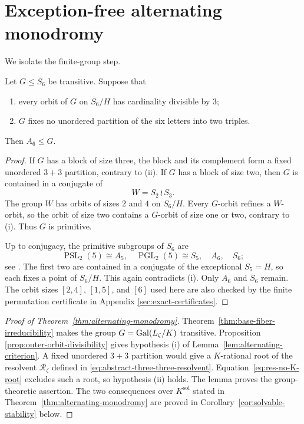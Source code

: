 \section{Exception-free alternating monodromy}
\label{sec:alternating-monodromy}

We isolate the finite-group step.

\begin{lemma}
\label{lem:alternating-criterion}
Let $G\le S_6$ be transitive.  Suppose that
\begin{enumerate}[label=\textup{(\roman*)}]
 \item every orbit of $G$ on $S_6/H$ has cardinality divisible by $3$;
 \item $G$ fixes no unordered partition of the six letters into two
       triples.
\end{enumerate}
Then $A_6\le G$.
\end{lemma}

\begin{proof}
If $G$ has a block of size three, the block and its complement form a
fixed unordered $3+3$ partition, contrary to \textup{(ii)}.  If $G$
has a block of size two, then $G$ is contained in a conjugate of
\[
 W=S_2\mathbin{\wr}S_3.
\]
The group $W$ has orbits of sizes $2$ and $4$ on $S_6/H$.  Every
$G$-orbit refines a $W$-orbit, so the orbit of size two contains a
$G$-orbit of size one or two, contrary to \textup{(i)}.  Thus $G$ is
primitive.

Up to conjugacy, the primitive subgroups of $S_6$ are
\[
 \operatorname{PSL}_2(5)\cong A_5,\quad
 \operatorname{PGL}_2(5)\cong S_5,\quad A_6,\quad S_6;
\]
see \cite{ButlerMcKay1983}.  The first two are contained in a conjugate
of the exceptional $S_5=H$, so each fixes a point of $S_6/H$.  This
again contradicts \textup{(i)}.  Only $A_6$ and $S_6$ remain.
The orbit sizes $[2,4]$, $[1,5]$, and $[6]$ used here are also checked
by the finite permutation certificate in Appendix
\ref{sec:exact-certificates}.
\end{proof}

\begin{proof}[Proof of Theorem~\ref{thm:alternating-monodromy}]
Theorem~\ref{thm:base-fiber-irreducibility} makes the group
$G=\operatorname{Gal}(L_\zeta/K)$ transitive.  Proposition
\ref{prop:outer-orbit-divisibility} gives hypothesis \textup{(i)} of
Lemma~\ref{lem:alternating-criterion}.  A fixed unordered $3+3$
partition would give a $K$-rational root of the resolvent
$\mathcal R_\zeta$ defined in \eqref{eq:abstract-three-three-resolvent}.
Equation~\eqref{eq:res-no-K-root} excludes such a root, so hypothesis
\textup{(ii)} holds.  The lemma proves the group-theoretic assertion.
The two consequences over $K^{\mathrm{sol}}$ stated in
Theorem~\ref{thm:alternating-monodromy} are proved in
Corollary~\ref{cor:solvable-stability} below.
\end{proof}

